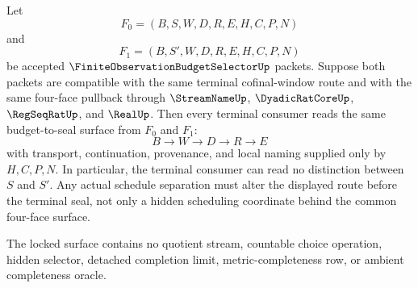 \begin{theorem}
\label{thm:finite-observation-budget-selector-terminal-cofinal-schedule-lock}
Let
$$
F_0=(B,S,W,D,R,E,H,C,P,N)
$$
and
$$
F_1=(B,S',W,D,R,E,H,C,P,N)
$$
be accepted $\FiniteObservationBudgetSelectorUp$ packets. Suppose both packets are compatible with the same terminal cofinal-window route and with the same four-face pullback through $\StreamNameUp$, $\DyadicRatCoreUp$, $\RegSeqRatUp$, and $\RealUp$. Then every terminal consumer reads the same budget-to-seal surface from $F_0$ and $F_1$:
$$
B \to W \to D \to R \to E
$$
with transport, continuation, provenance, and local naming supplied only by $H,C,P,N$. In particular, the terminal consumer can read no distinction between $S$ and $S'$. Any actual schedule separation must alter the displayed route before the terminal seal, not only a hidden scheduling coordinate behind the common four-face surface.

The locked surface contains no quotient stream, countable choice operation, hidden selector, detached completion limit, metric-completeness row, or ambient completeness oracle.
\end{theorem}
